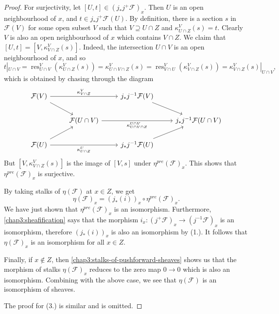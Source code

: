 \documentclass[12pt]{book}
\theoremstyle{definition}
\newcommand{\res}{\operatorname{res}}
\begin{document}
\begin{proof}
		For surjectivity, let $[U, t] \in (j_\ast j^{+} \mathcal{F})_x$. Then $U$ is an open neighbourhood of $x$, and $t \in j_\ast j^{+} \mathcal{F}(U)$. By definition, there is a section $s$ in $\mathcal{F}(V)$ for some open subset $V$ such that $V \supseteq U \cap Z$ and $\kappa^V_{U \cap Z}(s) = t$. Clearly $V$ is also an open neighbourhood of $x$ which contains $V \cap Z$. We claim that $[U, t] = [V, \kappa^V_{V \cap Z}(s)]$. Indeed, the intersection $U \cap V$ is an open neighbourhood of $x$, and so
		\begin{equation*}
			t|_{U \cap V} = \res^{V}_{U \cap V} (\kappa^V_{U \cap Z}(s) )= \kappa^{V}_{U \cap V \cap Z}(s) = \res^V_{V \cap U}(\kappa^V_{V \cap Z}(s)) = \kappa^V_{V \cap Z}(s)|_{U \cap V},
		\end{equation*}
		which is obtained by chasing through the diagram
		\[\begin{tikzcd}
			{\mathcal{F}(V)} && {j_\ast j^{-1}\mathcal{F}(V)} & \\
			& {\mathcal{F}(U \cap V)} && {j_\ast j^{-1}\mathcal{F}(U\cap V)} \\
			{\mathcal{F}(U)} && {j_\ast j^{-1}\mathcal{F}(U)}
			\arrow["{\kappa^V_{V \cap Z}}", from=1-1, to=1-3]
			\arrow[from=1-1, to=2-2]
			\arrow[from=1-3, to=2-4]
			\arrow["{\kappa^{U\cap V}_{U \cap V \cap Z}}"', from=2-2, to=2-4]
			\arrow[from=3-1, to=2-2]
			\arrow["{\kappa^U_{U \cap Z}}"', from=3-1, to=3-3]
			\arrow[from=3-3, to=2-4]
		\end{tikzcd}
		\]
		But $[V, \kappa^V_{V \cap Z}(s)]$ is the image of $[V, s]$ under $\eta^{pre}(\mathcal{F})_x$. This shows that $\eta^{pre}(\mathcal{F})_x$ is surjective.
		
		By taking stalks of $\eta(\mathcal{F})$ at $x \in Z$, we get
		\begin{equation*}
			\eta(\mathcal{F})_x = (j_\ast(i))_x \circ \eta^{pre}(\mathcal{F})_x.
		\end{equation*}
		We have just shown that $\eta^{pre}(\mathcal{F})_x$ is an isomorphism. Furthermore, \cref{chap3:sheafification} says that the morphism $i_x \colon (j^{+}\mathcal{F})_x \to (j^{-1}\mathcal{F})_x$ is an isomorphism, therefore $(j_\ast(i))_x$ is also an isomorphism by (1.). It follows that $\eta(\mathcal{F})_x$ is an isomorphism for all $x \in Z$.
		
		Finally, if $x \notin Z$, then \cref{chap3:stalks-of-pushforward-sheaves} shows us that the morphism of stalks $\eta(\mathcal{F})_x$ reduces to the zero map $0 \to 0$ which is also an isomorphism. Combining with the above case, we see that $\eta(\mathcal{F})$ is an isomorphism of sheaves.
		
		The proof for (3.) is similar and is omitted.
	\end{proof}
	
\end{document}

